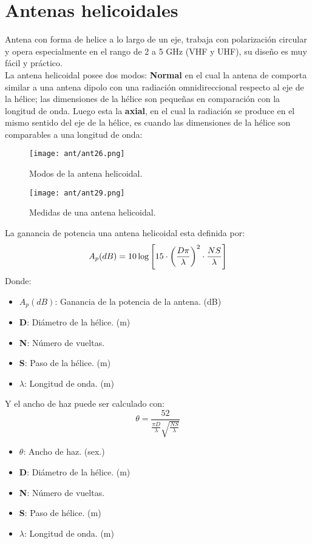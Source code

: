 \documentclass[
	12pt, %
	fleqn, %
	a4paper, %
	oneside, %
]{LegrandOrangeBook}
\begin{document}
\section{Antenas helicoidales}
Antena con forma de helice a lo largo de un eje, trabaja con polarización circular y opera especialmente en el rango de 2 a 5 GHz (VHF y UHF), su diseño es muy fácil y práctico.\\
La antena helicoidal posee dos modos: \textbf{Normal} en el cual la antena de comporta similar a una antena dipolo con una radiación omnidireccional respecto al eje de la hélice; las dimensiones de la hélice son pequeñas en comparación con la longitud de onda. Luego esta la \textbf{axial}, en el cual la radiación se produce en el mismo sentido del eje de la hélice, es cuando las dimensiones de la hélice son comparables a una longitud de onda:
\begin{figure}[H]
\centering
\texttt{[image: ant/ant26.png]}
\caption{Modos de la antena helicoidal.}
\end{figure}
\begin{figure}[H]
\centering
\texttt{[image: ant/ant29.png]}
\caption{Medidas de una antena helicoidal.}
\end{figure}
La ganancia de potencia una antena helicoidal esta definida por:
\begin{equation}
A_p(dB)=10\log\left[15\cdot \left(\frac{D\pi}{\lambda}\right)^2\cdot\frac{NS}{\lambda}\right]
\end{equation}
Donde:
\begin{itemize}
\item $A_p(dB)$: Ganancia de la potencia de la antena. (dB)
\item \textbf{D}: Diámetro de la hélice. (m)
\item \textbf{N}: Número de vueltas.
\item \textbf{S}: Paso de la hélice. (m)
\item $\lambda$: Longitud de onda. (m)
\end{itemize}
Y el ancho de haz puede ser calculado con:
\begin{equation}
\theta=\frac{52}{\frac{\pi D}{\lambda}\sqrt{\frac{NS}{\lambda}}}
\end{equation}
\begin{itemize}
\item $\theta$: Ancho de haz. (sex.)
\item \textbf{D}: Diámetro de la hélice. (m)
\item \textbf{N}: Número de vueltas.
\item \textbf{S}: Paso de hélice. (m)
\item $\lambda$: Longitud de onda. (m)
\end{itemize}
\end{document}

